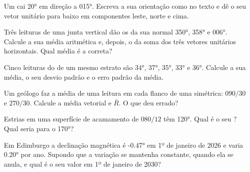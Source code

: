 \begin{exercise}[$\star$]\label{exo:b1:field-lab-methods-1:3}
Um  cai \ang{20} em direção a \ang{015}. Escreva a sua orientação como no texto e dê o seu vetor unitário para baixo em componentes leste, norte e cima.
\end{exercise}

\begin{exercise}[$\star$]\label{exo:b1:field-lab-methods-1:4}
Três leituras de uma junta vertical dão os  da sua normal \ang{350}, \ang{358} e \ang{006}. Calcule a sua média aritmética e, depois, o  da soma dos três vetores unitários horizontais. Qual média é a correta?
\end{exercise}

\begin{exercise}[$\star\star$]\label{exo:b1:field-lab-methods-1:5}
Cinco leituras do  de um mesmo estrato são \ang{34}, \ang{37}, \ang{35}, \ang{33} e \ang{36}. Calcule a sua média, o seu desvio padrão e o erro padrão da média.
\end{exercise}

\begin{exercise}[$\star\star$]\label{exo:b1:field-lab-methods-1:6}
Um geólogo faz a média de uma leitura em cada flanco de uma  simétrica: $090/30$ e $270/30$. Calcule a média vetorial e $\bar R$. O que deu errado?
\end{exercise}

\begin{exercise}[$\star\star$]\label{exo:b1:field-lab-methods-1:7}
Estrias em uma superfície de acamamento de  $080/12$ têm  \ang{120}. Qual é o seu ? Qual seria para o  \ang{170}?
\end{exercise}

\begin{exercise}[$\star\star$]\label{exo:b1:field-lab-methods-1:8}
Em Edimburgo a declinação magnética é \ang{-0.47} em 1º de janeiro de 2026 e varia \ang{+0.20} por ano. Supondo que a variação se mantenha constante, quando ela se anula, e qual é o seu valor em 1º de janeiro de 2030?
\end{exercise}

